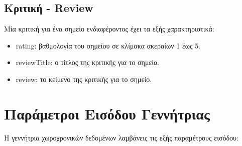 \subsection{Κριτική - Review}

Μία κριτική για ένα σημείο ενδιαφέροντος έχει τα εξής χαρακτηριστικά:

\begin{itemize}
 \item rating: βαθμολογία του σημείου σε κλίμακα ακεραίων 1 έως 5.
 \item reviewTitle: ο τίτλος της κριτικής για το σημείο.
 \item review: το κείμενο της κριτικής για το σημείο.
\end{itemize}

\section{Παράμετροι Εισόδου Γεννήτριας}

Η γεννήτρια χωροχρονικών δεδομένων λαμβάνεις τις εξής παραμέτρους εισόδου:

